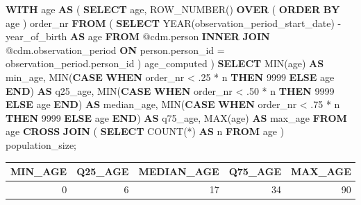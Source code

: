 \documentclass[11pt]{book}
\newenvironment{Shaded}{\begin{snugshade}}{\end{snugshade}}
\newcommand{\KeywordTok}[1]{\textcolor[rgb]{0.13,0.29,0.53}{\textbf{#1}}}
\newcommand{\DataTypeTok}[1]{\textcolor[rgb]{0.13,0.29,0.53}{#1}}
\newcommand{\DecValTok}[1]{\textcolor[rgb]{0.00,0.00,0.81}{#1}}
\newcommand{\FunctionTok}[1]{\textcolor[rgb]{0.00,0.00,0.00}{#1}}
\newcommand{\NormalTok}[1]{#1}
\begin{document}
\begin{Shaded}
\begin{Highlighting}[]
\KeywordTok{WITH}\NormalTok{ age}
\KeywordTok{AS}\NormalTok{ (}
    \KeywordTok{SELECT}\NormalTok{ age,}
        \FunctionTok{ROW_NUMBER}\NormalTok{() }\KeywordTok{OVER}\NormalTok{ (}
            \KeywordTok{ORDER} \KeywordTok{BY}\NormalTok{ age}
\NormalTok{            ) order_nr}
    \KeywordTok{FROM}\NormalTok{ (}
        \KeywordTok{SELECT} \DataTypeTok{YEAR}\NormalTok{(observation_period_start_date) - year_of_birth }\KeywordTok{AS}\NormalTok{ age}
        \KeywordTok{FROM}\NormalTok{ @cdm.person}
        \KeywordTok{INNER} \KeywordTok{JOIN}\NormalTok{ @cdm.observation_period}
            \KeywordTok{ON}\NormalTok{ person.person_id = observation_period.person_id}
\NormalTok{        ) age_computed}
\NormalTok{    )}
\KeywordTok{SELECT} \FunctionTok{MIN}\NormalTok{(age) }\KeywordTok{AS}\NormalTok{ min_age,}
    \FunctionTok{MIN}\NormalTok{(}\KeywordTok{CASE} 
            \KeywordTok{WHEN}\NormalTok{ order_nr < .}\DecValTok{25}\NormalTok{ * n}
                \KeywordTok{THEN} \DecValTok{9999}
            \KeywordTok{ELSE}\NormalTok{ age}
            \KeywordTok{END}\NormalTok{) }\KeywordTok{AS}\NormalTok{ q25_age,}
    \FunctionTok{MIN}\NormalTok{(}\KeywordTok{CASE} 
            \KeywordTok{WHEN}\NormalTok{ order_nr < .}\DecValTok{50}\NormalTok{ * n}
                \KeywordTok{THEN} \DecValTok{9999}
            \KeywordTok{ELSE}\NormalTok{ age}
            \KeywordTok{END}\NormalTok{) }\KeywordTok{AS}\NormalTok{ median_age,}
    \FunctionTok{MIN}\NormalTok{(}\KeywordTok{CASE} 
            \KeywordTok{WHEN}\NormalTok{ order_nr < .}\DecValTok{75}\NormalTok{ * n}
                \KeywordTok{THEN} \DecValTok{9999}
            \KeywordTok{ELSE}\NormalTok{ age}
            \KeywordTok{END}\NormalTok{) }\KeywordTok{AS}\NormalTok{ q75_age,}
    \FunctionTok{MAX}\NormalTok{(age) }\KeywordTok{AS}\NormalTok{ max_age}
\KeywordTok{FROM}\NormalTok{ age}
\KeywordTok{CROSS} \KeywordTok{JOIN}\NormalTok{ (}
    \KeywordTok{SELECT} \FunctionTok{COUNT}\NormalTok{(*) }\KeywordTok{AS}\NormalTok{ n}
    \KeywordTok{FROM}\NormalTok{ age}
\NormalTok{    ) population_size;}
\end{Highlighting}
\end{Shaded}

\begin{longtable}[]{@{}rrrrr@{}}
\toprule
MIN\_AGE & Q25\_AGE & MEDIAN\_AGE & Q75\_AGE & MAX\_AGE\tabularnewline
\midrule
\endhead
0 & 6 & 17 & 34 & 90\tabularnewline
\bottomrule
\end{longtable}
\end{document}
